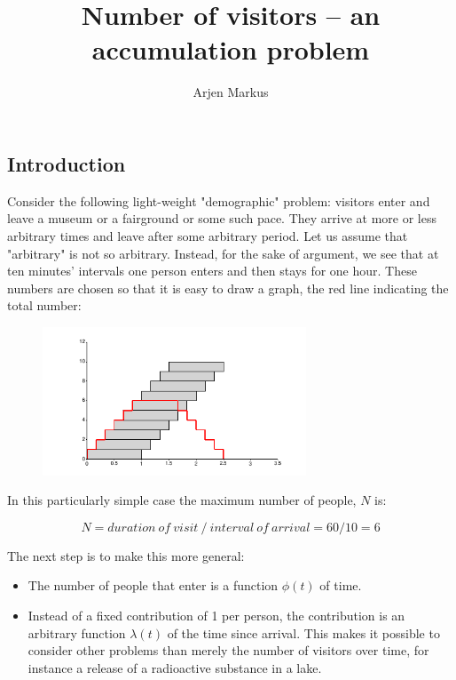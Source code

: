 \documentclass[onecolumn]{article}
\begin{document}
\title{Number of visitors -- an accumulation problem}

\author{Arjen Markus}

\maketitle


\subsection*{Introduction}

Consider the following light-weight "demographic" problem: visitors enter and leave
a museum or a fairground or some such pace. They arrive at more or less arbitrary times
and leave after some arbitrary period. Let us assume that "arbitrary" is not so arbitrary.
Instead, for the sake of argument, we see that at ten minutes' intervals one person enters
and then stays for one hour. These numbers are chosen so that it is easy to draw a graph,
the red line indicating the total number:

\begin{figure}[h]
\begin{center}
\includegraphics[width=0.7\textwidth]{number_visitors_rough.pdf}
\label{visitorsRough}
\end{center}
\end{figure}

In this particularly simple case the maximum number of people, $N$ is:

\begin{equation}
     N = duration~of~visit~/~interval~of~arrival = 60 / 10 = 6
\end{equation}

The next step is to make this more general:
\begin{itemize}
\item
The number of people that enter is a function $\phi(t)$ of time.
\item
Instead of a fixed contribution of 1 per person, the contribution is an arbitrary function $\lambda(t)$ of the
time since arrival. This makes it possible to consider other problems than merely the number of visitors
over time, for instance a release of a radioactive substance in a lake.
\end{itemize}
\end{document}
